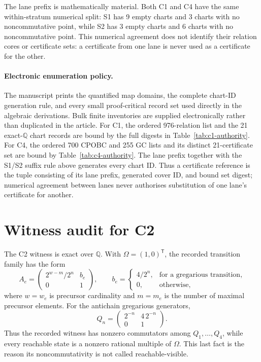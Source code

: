 \documentclass[11pt]{article}
\theoremstyle{definition}
\theoremstyle{remark}
\newcommand{\QQ}{\mathbb{Q}}
\begin{document}
The lane prefix is mathematically material.  Both C1 and C4 have the same
within-stratum numerical split: S1 has 9 empty charts and 3 charts with no
noncommutative point, while S2 has 3 empty charts and 6 charts with no
noncommutative point.  This numerical agreement does not identify their
relation cores or certificate sets: a certificate from one lane is never
used as a certificate for the other.

\paragraph{Electronic enumeration policy.}
The manuscript prints the quantified map domains, the complete chart-ID
generation rule, and every small proof-critical record set used directly in
the algebraic derivations.  Bulk finite inventories are supplied
electronically rather than duplicated in the article.  For C1, the ordered
976-relation list and the 21 exact-\(\QQ\) chart records are bound by the
full digests in Table~\ref{tab:c1-authority}.  For C4, the ordered 700 CPOBC
and 255 GC lists and its distinct 21-certificate set are bound by
Table~\ref{tab:c4-authority}.  The lane prefix together with the S1/S2 suffix
rule above generates every chart ID.  Thus a certificate reference is the
tuple consisting of its lane prefix, generated cover ID, and bound set
digest; numerical agreement between lanes never authorises substitution of
one lane's certificate for another.

\section{Witness audit for C2}

The C2 witness is exact over \(\QQ\).  With
\(\Omega=(1,0)^\mathsf{T}\), the recorded transition family has the form
\[
 A_e=
 \begin{pmatrix}2^{w-m}/2^n & b_e\\0&1\end{pmatrix},
 \qquad
 b_e=\begin{cases}4/2^n,&\text{for a gregarious transition},\\
                    0,&\text{otherwise},\end{cases}
\]
where \(w=w_e\) is precursor cardinality and \(m=m_e\) is the number of
maximal precursor elements.  For the
antichain gregarious generators,
\[
 Q_n=\begin{pmatrix}2^{-n}&4\,2^{-n}\\0&1\end{pmatrix}.
\]
Thus the recorded witness has nonzero commutators among
\(Q_1,\ldots,Q_4\), while every reachable state is a nonzero rational
multiple of \(\Omega\).  This last fact is the reason its noncommutativity
is not called reachable-visible.
\end{document}
